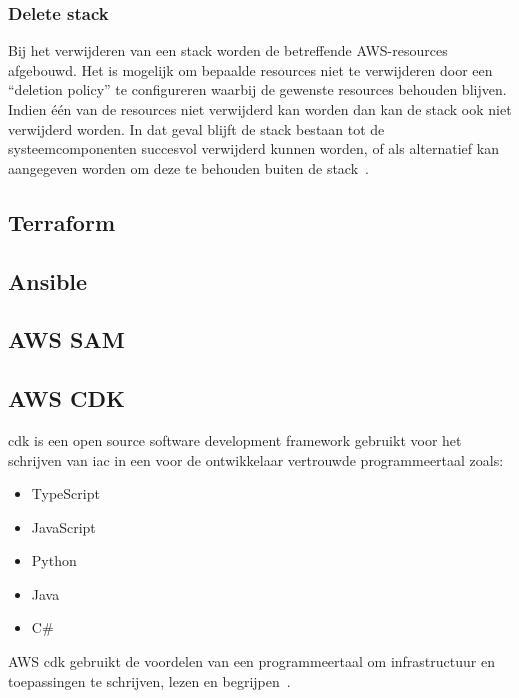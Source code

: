 \subsubsection{Delete stack}

Bij het verwijderen van een stack worden de betreffende AWS-resources afgebouwd.
Het is mogelijk om bepaalde resources niet te verwijderen door een “deletion policy” te configureren waarbij de gewenste resources behouden blijven.
Indien één van de resources niet verwijderd kan worden dan kan de stack ook niet verwijderd worden.
In dat geval blijft de stack bestaan tot de systeemcomponenten succesvol verwijderd kunnen worden, of als alternatief kan aangegeven worden om deze te behouden buiten de stack~\autocite{AWSCLoudformationUser}.

\subsection{Terraform}
\label{subsec:service-terraform}

\subsection{Ansible}
\label{subsec:service-ansible}

\subsection{AWS SAM}
\label{subsec:service-sam}

\subsection{AWS CDK}
\label{subsec:service-cdk}

\acrfull{cdk} is een open source software development framework gebruikt voor het schrijven van \acrfull{iac} in een voor de ontwikkelaar vertrouwde programmeertaal zoals:

\begin{itemize}
    \item TypeScript
    \item JavaScript
    \item Python
    \item Java
    \item C\#
\end{itemize}

AWS \acrshort{cdk} gebruikt de voordelen van een programmeertaal om infrastructuur en toepassingen te schrijven, lezen en begrijpen~\autocite{Mansoor2014}.

